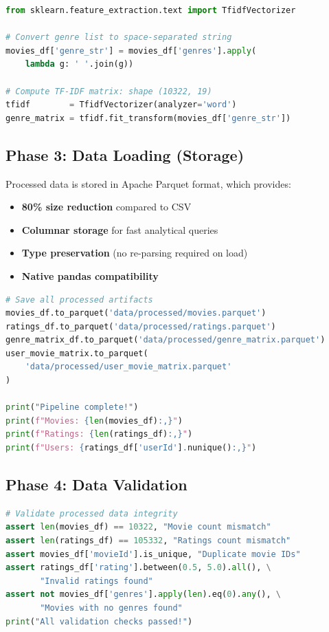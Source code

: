 \documentclass[12pt,a4paper]{report}
\begin{document}
\begin{lstlisting}[language=Python, caption={TF-IDF Genre Vectorization}]
from sklearn.feature_extraction.text import TfidfVectorizer

# Convert genre list to space-separated string
movies_df['genre_str'] = movies_df['genres'].apply(
    lambda g: ' '.join(g))

# Compute TF-IDF matrix: shape (10322, 19)
tfidf        = TfidfVectorizer(analyzer='word')
genre_matrix = tfidf.fit_transform(movies_df['genre_str'])
\end{lstlisting}

\subsection{Phase 3: Data Loading (Storage)}

Processed data is stored in Apache Parquet format, which provides:
\begin{itemize}
    \item \textbf{80\% size reduction} compared to CSV
    \item \textbf{Columnar storage} for fast analytical queries
    \item \textbf{Type preservation} (no re-parsing required on load)
    \item \textbf{Native pandas compatibility}
\end{itemize}

\begin{lstlisting}[language=Python, caption={Saving Processed Data as Parquet}]
# Save all processed artifacts
movies_df.to_parquet('data/processed/movies.parquet')
ratings_df.to_parquet('data/processed/ratings.parquet')
genre_matrix_df.to_parquet('data/processed/genre_matrix.parquet')
user_movie_matrix.to_parquet(
    'data/processed/user_movie_matrix.parquet'
)

print("Pipeline complete!")
print(f"Movies: {len(movies_df):,}")
print(f"Ratings: {len(ratings_df):,}")
print(f"Users: {ratings_df['userId'].nunique():,}")
\end{lstlisting}

\subsection{Phase 4: Data Validation}

\begin{lstlisting}[language=Python, caption={Data Validation Checks}]
# Validate processed data integrity
assert len(movies_df) == 10322, "Movie count mismatch"
assert len(ratings_df) == 105332, "Ratings count mismatch"
assert movies_df['movieId'].is_unique, "Duplicate movie IDs"
assert ratings_df['rating'].between(0.5, 5.0).all(), \
       "Invalid ratings found"
assert not movies_df['genres'].apply(len).eq(0).any(), \
       "Movies with no genres found"
print("All validation checks passed!")
\end{lstlisting}
\end{document}
